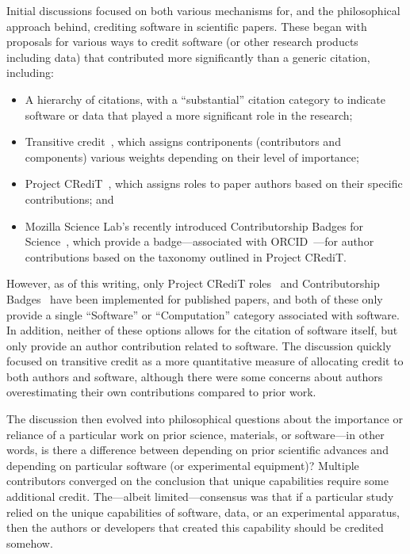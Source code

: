 Initial discussions focused on both various mechanisms for, and the
philosophical approach behind, crediting software in scientific papers. These
began with proposals for various ways to credit software (or other research
products including data) that contributed more significantly than a generic
citation, including:
\begin{itemize}

\item A hierarchy of citations, with a ``substantial'' citation category to
indicate software or data that played a more significant role in the research;

\item Transitive credit~\cite{wssspe2_katz,Katz:2014_tc}, which assigns
contriponents (contributors and components) various weights depending on their
level of importance;
    
\item Project CRediT~\cite{projectcredit}, which assigns roles to paper authors
based on their specific contributions; and
    
\item Mozilla Science Lab's recently introduced Contributorship Badges for
Science~\cite{Mozilla_badges}, which provide a badge---associated with
ORCID~\cite{orcid}---for author contributions based on the taxonomy
outlined in Project CRediT.
    
\end{itemize}
However, as of this writing, only Project CRediT
roles~\cite{McCall2015_credit,Lin2015_credit} and Contributorship
Badges~\cite{Mozilla_badges} have been implemented for published papers, and
both of these only provide a single ``Software'' or ``Computation'' category
associated with software. In addition, neither of these options allows for the
citation of software itself, but only provide an author contribution related to
software. The discussion quickly focused on transitive credit as a more
quantitative measure of allocating credit to both authors and software, although
there were some concerns about authors overestimating their own contributions
compared to prior work.

The discussion then evolved into philosophical questions about the importance or
reliance of a particular work on prior science, materials, or software---in
other words, is there a difference between depending on prior scientific
advances and depending on particular software (or experimental equipment)?
Multiple contributors converged on the conclusion that unique capabilities
require some additional credit. The---albeit limited---consensus was that if a
particular study relied on the unique capabilities of software, data, or an
experimental apparatus, then the authors or developers that created this
capability should be credited somehow.

